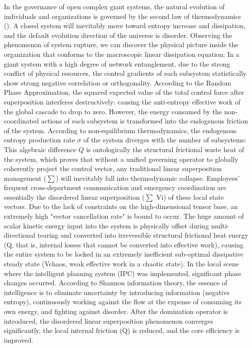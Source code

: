 \documentclass[11pt,a4paper]{article}
\begin{document}
In the governance of open complex giant systems, the natural evolution of individuals and organizations is governed by the second law of thermodynamics (). A closed system will inevitably move toward entropy increase and dissipation, and the default evolution direction of the universe is disorder. Observing the phenomenon of system rupture, we can discover the physical picture inside the organization that conforms to the macroscopic linear dissipation equation: In a giant system with a high degree of network entanglement, due to the strong conflict of physical resources, the control gradients of each subsystem statistically show strong negative correlation or orthogonality. According to the Random Phase Approximation, the squared expected value of the total control force after superposition interferes destructively: causing the anti-entropy effective work of the global cascade to drop to zero. However, the energy consumed by the non-coordinated actions of each subsystem is transformed into the endogenous friction of the system. According to non-equilibrium thermodynamics, the endogenous entropy production rate $\sigma$ of the system diverges with the number of subsystems: This algebraic difference $Q$ is ontologically the structural frictional waste heat of the system, which proves that without a unified governing operator to globally coherently project the control vector, any traditional linear superposition management ($\sum$) will inevitably fall into thermodynamic collapse. Employees' frequent cross-department communication and emergency coordination are essentially the disordered linear superposition ($\sum$ Vi) of these local state vectors. Due to the lack of constraints on the high-dimensional tensor base, an extremely high "vector cancellation rate" is bound to occur. The huge amount of scalar kinetic energy input into the system is physically offset during multi-directional tearing and converted into irreversible structural frictional heat energy (Q, that is, internal losses that cannot be converted into effective work), causing the entire system to be locked in an extremely inefficient sub-optimal dissipative steady state (Vchaos, weak effective work in a chaotic state). In the local scene where the intelligent planning system (IPC) was implemented, significant phase changes occurred. According to Shannon information theory, the essence of intelligence is to eliminate uncertainty by introducing information (negative entropy), continuously working against the flow at the expense of consuming its own energy, and fighting against disorder. After the domination operator is introduced, the disordered linear superposition phenomenon converges significantly, the local internal friction (Q) is reduced, and the core efficiency is improved.
\end{document}
